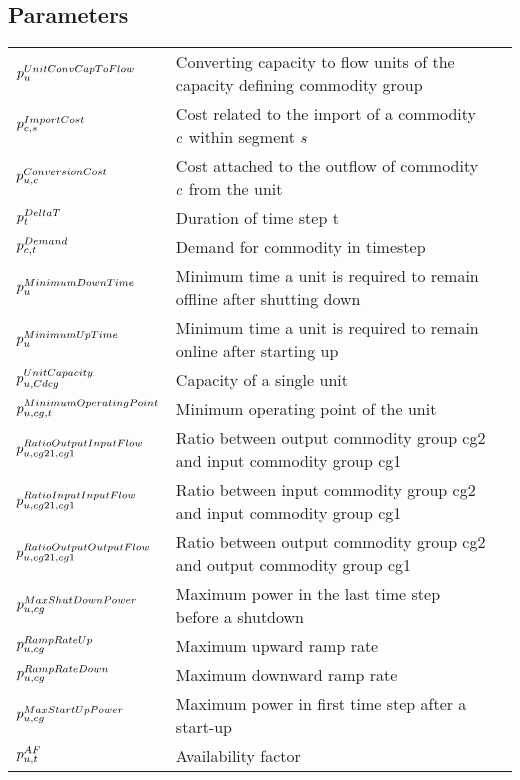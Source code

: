 \subsection*{Parameters}
\vspace{-1em}
	\begin{longtable}{p{\cola} p{\colc} >{\small\raggedleft\arraybackslash\itshape}p{\colb}}

		$p^{UnitConvCapToFlow}_{u}$	& Converting capacity to flow units of the capacity defining commodity group	&                \\[0.5em]

		$p^{ImportCost}_{c,s}   $	& Cost related to the import of a commodity $c$ within segment $s$ 	&                \\[0.5em]

		$p^{ConversionCost}_{u,c}$	& Cost attached to the outflow of commodity $c$ from the unit	&                \\[0.5em]

		$p^{DeltaT}_{t}       $	& Duration of time step t                                     	&                \\[0.5em]

		$p^{Demand}_{c,t}       $	& Demand for commodity \commodity in timestep \timestep       	&                \\[0.5em]

		$p^{MinimumDownTime}_{u}$	& Minimum time a unit is required to remain offline after shutting down	&                \\
		$p^{MinimumUpTime}_{u}$	& Minimum time a unit is required to remain online after starting up	&                \\
		$p^{UnitCapacity}_{u,Cdcg} $	& Capacity of a single unit                                   	&                \\
		$p^{MinimumOperatingPoint}_{u,cg,t}$	& Minimum operating point of the unit                         	&                \\
		$p^{RatioOutputInputFlow}_{u,cg21,cg1}$	& Ratio between output commodity group cg2 and input commodity group cg1	&                \\
		$p^{RatioInputInputFlow}_{u,cg21,cg1}$	& Ratio between input commodity group cg2 and input commodity group cg1	&                \\
		$p^{RatioOutputOutputFlow}_{u,cg21,cg1}$	& Ratio between output commodity group cg2 and output commodity group cg1	&                \\
		$p^{MaxShutDownPower}_{u,cg}$	& Maximum power in the last time step before a shutdown       	&                \\
		$p^{RampRateUp}_{u,cg}   $	& Maximum upward ramp rate                                    	&                \\
		$p^{RampRateDown}_{u,cg} $	& Maximum downward ramp rate                                  	&                \\
		$p^{MaxStartUpPower}_{u,cg}$	& Maximum power in first time step after a start-up           	&                \\
		$p^{AF}_{u,t}           $	& Availability factor                                         	&                \\
	\end{longtable}

